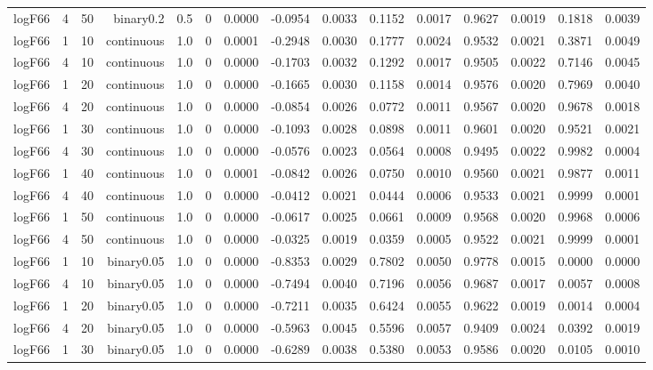 \begin{longtable}{rrrrrrrrrrrrrrr}
  logF66 & 4 & 50 & binary0.2 & 0.5 & 0 & 0.0000 & -0.0954 & 0.0033 & 0.1152 & 0.0017 & 0.9627 & 0.0019 & 0.1818 & 0.0039 \\ 
  logF66 & 1 & 10 & continuous & 1.0 & 0 & 0.0001 & -0.2948 & 0.0030 & 0.1777 & 0.0024 & 0.9532 & 0.0021 & 0.3871 & 0.0049 \\ 
  logF66 & 4 & 10 & continuous & 1.0 & 0 & 0.0000 & -0.1703 & 0.0032 & 0.1292 & 0.0017 & 0.9505 & 0.0022 & 0.7146 & 0.0045 \\ 
  logF66 & 1 & 20 & continuous & 1.0 & 0 & 0.0000 & -0.1665 & 0.0030 & 0.1158 & 0.0014 & 0.9576 & 0.0020 & 0.7969 & 0.0040 \\ 
  logF66 & 4 & 20 & continuous & 1.0 & 0 & 0.0000 & -0.0854 & 0.0026 & 0.0772 & 0.0011 & 0.9567 & 0.0020 & 0.9678 & 0.0018 \\ 
  logF66 & 1 & 30 & continuous & 1.0 & 0 & 0.0000 & -0.1093 & 0.0028 & 0.0898 & 0.0011 & 0.9601 & 0.0020 & 0.9521 & 0.0021 \\ 
  logF66 & 4 & 30 & continuous & 1.0 & 0 & 0.0000 & -0.0576 & 0.0023 & 0.0564 & 0.0008 & 0.9495 & 0.0022 & 0.9982 & 0.0004 \\ 
  logF66 & 1 & 40 & continuous & 1.0 & 0 & 0.0001 & -0.0842 & 0.0026 & 0.0750 & 0.0010 & 0.9560 & 0.0021 & 0.9877 & 0.0011 \\ 
  logF66 & 4 & 40 & continuous & 1.0 & 0 & 0.0000 & -0.0412 & 0.0021 & 0.0444 & 0.0006 & 0.9533 & 0.0021 & 0.9999 & 0.0001 \\ 
  logF66 & 1 & 50 & continuous & 1.0 & 0 & 0.0000 & -0.0617 & 0.0025 & 0.0661 & 0.0009 & 0.9568 & 0.0020 & 0.9968 & 0.0006 \\ 
  logF66 & 4 & 50 & continuous & 1.0 & 0 & 0.0000 & -0.0325 & 0.0019 & 0.0359 & 0.0005 & 0.9522 & 0.0021 & 0.9999 & 0.0001 \\ 
  logF66 & 1 & 10 & binary0.05 & 1.0 & 0 & 0.0000 & -0.8353 & 0.0029 & 0.7802 & 0.0050 & 0.9778 & 0.0015 & 0.0000 & 0.0000 \\ 
  logF66 & 4 & 10 & binary0.05 & 1.0 & 0 & 0.0000 & -0.7494 & 0.0040 & 0.7196 & 0.0056 & 0.9687 & 0.0017 & 0.0057 & 0.0008 \\ 
  logF66 & 1 & 20 & binary0.05 & 1.0 & 0 & 0.0000 & -0.7211 & 0.0035 & 0.6424 & 0.0055 & 0.9622 & 0.0019 & 0.0014 & 0.0004 \\ 
  logF66 & 4 & 20 & binary0.05 & 1.0 & 0 & 0.0000 & -0.5963 & 0.0045 & 0.5596 & 0.0057 & 0.9409 & 0.0024 & 0.0392 & 0.0019 \\ 
  logF66 & 1 & 30 & binary0.05 & 1.0 & 0 & 0.0000 & -0.6289 & 0.0038 & 0.5380 & 0.0053 & 0.9586 & 0.0020 & 0.0105 & 0.0010 \\ 

\end{longtable}
